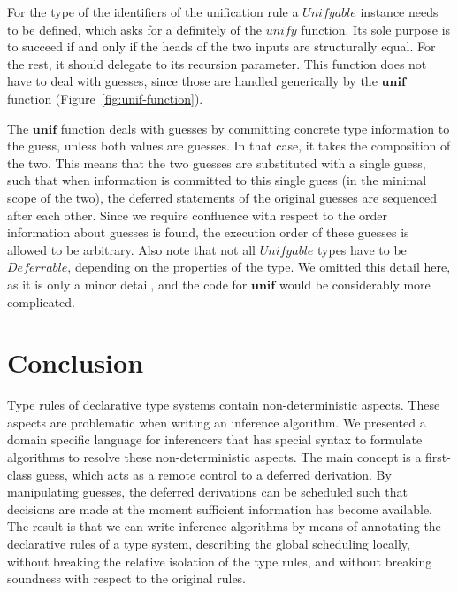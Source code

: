 \documentclass[preprint,natbib]{sigplanconf}
\newcommand{\Conid}[1]{\mathit{#1}}
\newcommand{\Varid}[1]{\mathit{#1}}
\begin{document}
    For the type of the identifiers of the unification rule a \ensuremath{\Conid{Unifyable}} instance needs to be defined,
    which asks for a definitely of the \ensuremath{\Varid{unify}} function. Its sole purpose is to succeed if and only if the
    heads of the two inputs are structurally equal. For the rest, it should delegate to its recursion
    parameter. This function does not have to deal with guesses, since those are handled generically by the
    \ensuremath{\mathbf{unif}} function (Figure~\ref{fig:unif-function}). 

    The \ensuremath{\mathbf{unif}} function deals with guesses by committing concrete type information to the guess,
    unless both values are guesses. In that case, it takes the composition of the two. This means that
    the two guesses are substituted with a single guess, such that when information is committed to
    this single guess (in the minimal scope of the two), the deferred statements of the original guesses
    are sequenced after each other. Since we require confluence with respect to the order information
    about guesses is found, the execution order of these guesses is allowed to be arbitrary. Also note
    that not all \ensuremath{\Conid{Unifyable}} types have to be \ensuremath{\Conid{Deferrable}}, depending on the properties of the type. We
    omitted this detail here, as it is only a minor detail, and the code for \ensuremath{\mathbf{unif}} would be
    considerably more complicated.



\section{Conclusion}

  Type rules of declarative type systems contain non-deterministic aspects. These aspects are problematic when writing an inference
  algorithm. We presented a domain specific language for inferencers that has special syntax to formulate algorithms to resolve
  these non-deterministic aspects. The main concept is a first-class guess, which acts as a remote control to a deferred derivation.
  By manipulating guesses, the deferred derivations can be scheduled such that decisions are made at the moment sufficient information
  has become available. The result is that we can write inference algorithms by means of annotating the declarative rules of a
  type system, describing the global scheduling locally, without breaking the relative isolation of the type rules, and without
  breaking soundness with respect to the original rules.
\end{document}
